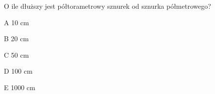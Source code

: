 \begin{tresc}
O ile dłuższy jest półtorametrowy sznurek od sznurka półmetrowego?
\end{tresc}
\begin{wariant}{A} 10 cm \end{wariant}
\begin{wariant}{B} 20 cm \end{wariant}
\begin{wariant}{C} 50 cm \end{wariant}
\begin{wariant}{D} 100 cm \end{wariant}
\begin{wariant}{E} 1000 cm \end{wariant}
